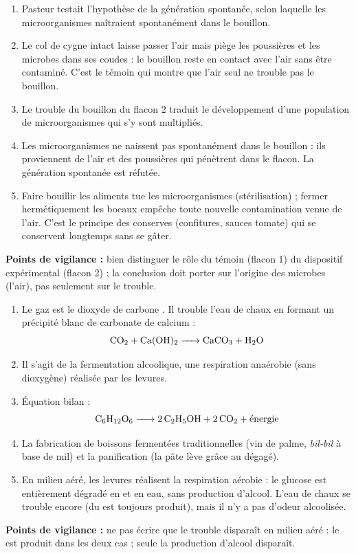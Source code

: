 \documentclass[11pt]{article}
\newcommand{\cle}[1]{{\popxbold\color{popdark}#1}}
\begin{document}
\begin{corrige}
\begin{enumerate}
\item Pasteur testait l'hypothèse de la \cle{génération spontanée}, selon laquelle les microorganismes naîtraient spontanément dans le bouillon.
\item Le col de cygne intact laisse passer l'air mais piège les poussières et les microbes dans ses coudes : le bouillon reste en contact avec l'air sans être contaminé. C'est le témoin qui montre que l'air seul ne trouble pas le bouillon.
\item Le trouble du bouillon du flacon 2 traduit le développement d'une population de microorganismes qui s'y sont multipliés.
\item Les microorganismes ne naissent pas spontanément dans le bouillon : ils proviennent de l'air et des poussières qui pénètrent dans le flacon. La génération spontanée est réfutée.
\item Faire bouillir les aliments tue les microorganismes (stérilisation) ; fermer hermétiquement les bocaux empêche toute nouvelle contamination venue de l'air. C'est le principe des conserves (confitures, sauces tomate) qui se conservent longtemps sans se gâter.
\end{enumerate}
\textbf{Points de vigilance :} bien distinguer le rôle du témoin (flacon 1) du dispositif expérimental (flacon 2) ; la conclusion doit porter sur l'origine des microbes (l'air), pas seulement sur le trouble.
\end{corrige}

\begin{corrige}
\begin{enumerate}
\item Le gaz est le \cle{dioxyde de carbone} . Il trouble l'eau de chaux en formant un précipité blanc de carbonate de calcium :
\[ \ce{CO2 + Ca(OH)2 -> CaCO3 + H2O} \]
\item Il s'agit de la \cle{fermentation alcoolique}, une respiration anaérobie (sans dioxygène) réalisée par les levures.
\item Équation bilan :
\[ \ce{C6H12O6 -> 2 C2H5OH + 2 CO2} + \text{énergie} \]
\item La fabrication de boissons fermentées traditionnelles (vin de palme, \emph{bil-bil} à base de mil) et la panification (la pâte lève grâce au  dégagé).
\item En milieu aéré, les levures réalisent la \cle{respiration aérobie} : le glucose est entièrement dégradé en  et en eau, sans production d'alcool. L'eau de chaux se trouble encore (du  est toujours produit), mais il n'y a pas d'odeur alcoolisée.
\end{enumerate}
\textbf{Points de vigilance :} ne pas écrire que le trouble disparaît en milieu aéré : le  est produit dans les deux cas ; seule la production d'alcool disparaît.
\end{corrige}
\end{document}
